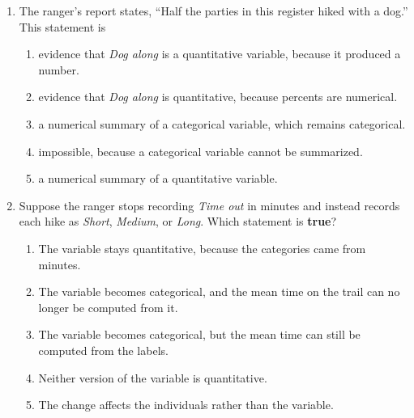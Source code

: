 \documentclass[12pt]{article}
\begin{document}
\begin{enumerate}[leftmargin=1.9em, itemsep=0.14in]
  \item The ranger's report states, ``Half the parties in this register hiked with a dog.''
        This statement is
        \begin{enumerate}[label=\textbf{(\Alph*)}, leftmargin=2.2em, itemsep=3pt]
          \item evidence that \emph{Dog along} is a quantitative variable, because it produced
                a number.
          \item evidence that \emph{Dog along} is quantitative, because percents are numerical.
          \item a numerical summary of a categorical variable, which remains categorical.
          \item impossible, because a categorical variable cannot be summarized.
          \item a numerical summary of a quantitative variable.
                \hfill{}
        \end{enumerate}

  \item Suppose the ranger stops recording \emph{Time out} in minutes and instead records each
        hike as \emph{Short}, \emph{Medium}, or \emph{Long}. Which statement is \textbf{true}?
        \begin{enumerate}[label=\textbf{(\Alph*)}, leftmargin=2.2em, itemsep=3pt]
          \item The variable stays quantitative, because the categories came from minutes.
          \item The variable becomes categorical, and the mean time on the trail can no longer
                be computed from it.
          \item The variable becomes categorical, but the mean time can still be computed from
                the labels.
          \item Neither version of the variable is quantitative.
          \item The change affects the individuals rather than the variable.
                \hfill{}
        \end{enumerate}

\end{enumerate}

\vspace{0.14in}
\end{document}
